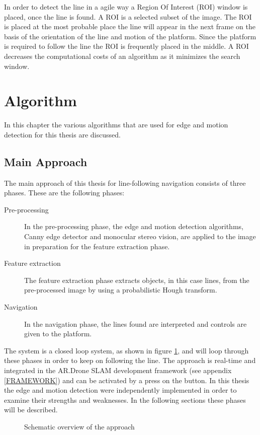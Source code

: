 \documentclass[a4paper]{article}
\begin{document}
In order to detect the line in a agile way a Region Of Interest (ROI) window is placed, once the line is found. A ROI is a selected subset of the image. The ROI is placed at the most probable place the line will appear in the next frame on the basis of the orientation of the line and motion of the platform. Since the platform is required to follow the line the ROI is frequently placed in the middle. A ROI decreases the computational costs of an algorithm as it minimizes the search window.

\newpage
\section{Algorithm}
\label{ALGORITHM}
In this chapter the various algorithms that are used for edge and motion detection for this thesis are discussed.

\subsection{Main Approach}
The main approach of this thesis for line-following navigation consists of three phases. These are the following phases:
\begin{description}
\item[Pre-processing] In the pre-processing phase, the edge and motion detection algorithms, Canny edge detector and monocular stereo vision, are applied to the image in preparation for the feature extraction phase.
\item[Feature extraction] The feature extraction phase extracts objects, in this case lines, from the pre-processed image by using a probabilistic Hough transform.
\item[Navigation] In the navigation phase, the lines found are interpreted and controls are given to the platform.
\end{description}
The system is a closed loop system, as shown in figure \ref{system_overview}, and will loop through these phases in order to keep on following the line. The approach is real-time and integrated in the AR.Drone SLAM \cite{Dijkshoorn2012} development framework (see appendix \ref{FRAMEWORK}) and can be activated by a press on the button. In this thesis the edge and motion detection were independently implemented in order to examine their strengths and weaknesses. In the following sections these phases will be described.

\begin{figure}[!ht]
\centerline{
}
\caption{Schematic overview of the approach}
\label{system_overview}
\end{figure}
\end{document}
